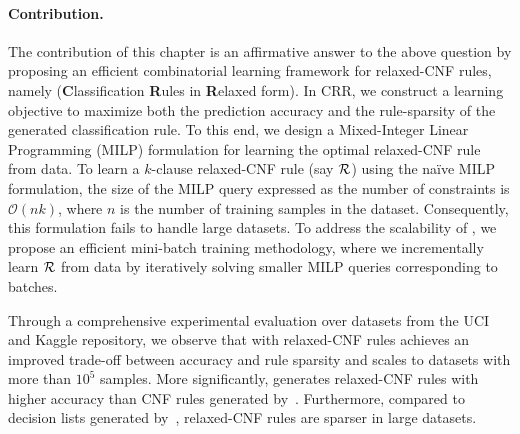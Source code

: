 \paragraph{Contribution.} The contribution of this chapter is an affirmative answer to the above question by proposing an efficient combinatorial learning framework for relaxed-CNF rules, namely {\crr} (\textbf{C}lassification \textbf{R}ules in \textbf{R}elaxed form). In CRR, we construct a learning objective to maximize both the prediction accuracy and the rule-sparsity of the generated classification rule. To this end, we design a  Mixed-Integer Linear Programming (MILP) formulation for learning the optimal relaxed-CNF rule from data. To learn a $ k $-clause relaxed-CNF rule (say $ {\mathcal{R}} $) using the na\"ive MILP formulation, the size of the MILP query expressed as the number of constraints is $ \mathcal{O}(nk) $, where $ n $ is the number of training samples in the dataset. Consequently, this formulation fails to handle large datasets. To address the scalability of {\crr},  we propose an efficient mini-batch training methodology, where we incrementally learn $ {\mathcal{R}} $ from data by iteratively solving smaller MILP queries corresponding to batches. 

{Through a comprehensive experimental evaluation over datasets from the UCI and Kaggle repository, we observe that {\crr} with relaxed-CNF rules achieves an improved trade-off between accuracy and rule sparsity and scales to datasets with more than $ 10^5 $ samples. More significantly, {\crr} generates relaxed-CNF rules with higher accuracy than CNF rules generated by~\cite{GM2019}. Furthermore, compared to decision lists generated by~\cite{cohen1995fast}, relaxed-CNF rules are sparser in large datasets.}
%


